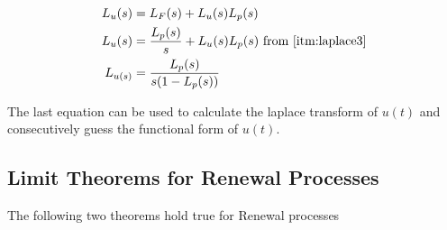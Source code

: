 \documentclass[../probability-notes.tex]{subfiles}
\begin{document}
    \begin{align*}
        L_{u}(s) &= L_{F}(s) + L_{u}(s) L_{p}(s)\\
        L_{u}(s) &= \frac{L_{p}(s)}{s} + L_{u}(s) L_{p}(s) \text{ from \ref{itm:laplace3}}\\
        L_{u(s)} &= \frac{L_{p}(s)}{s(1-L_{p}(s))}
    \end{align*}

    The last equation can be used to calculate the laplace transform of $u(t)$ and consecutively guess the functional form of $u(t)$.

    \subsection{Limit Theorems for Renewal Processes}
    The following two theorems hold true for Renewal processes
\end{document}
